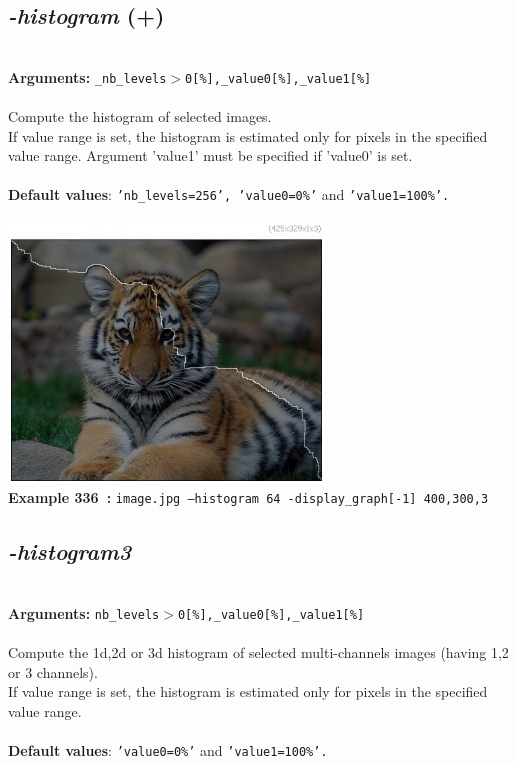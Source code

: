 \documentclass[a4paper,11pt,twoside]{book}
\begin{document}
\subsection{\emph{-histogram} (+)}\vspace*{-0.5em}
~\\\textbf{Arguments: } 
{\small \texttt{\_nb\_levels$>$0[\%],\_value0[\%],\_value1[\%]}}\\~\\
Compute the histogram of selected images.
~\\If value range is set, the histogram is estimated only for pixels in the specified
value range. Argument 'value1' must be specified if 'value0' is set.
~\\~\\\textbf{Default values}: {\small \texttt{'nb\_levels=256', 'value0=0\%'} and \texttt{'value1=100\%'.}}
\begin{center}\includegraphics[keepaspectratio=true,height=7cm,width=\textwidth]{img/gmic_def336.jpg}\\
{\footnotesize \textbf{Example 336~:} \texttt{image.jpg --histogram 64 -display\_graph[-1] 400,300,3}}
\end{center}

\subsection{\emph{-histogram3} }\vspace*{-0.5em}
~\\\textbf{Arguments: } 
{\small \texttt{nb\_levels$>$0[\%],\_value0[\%],\_value1[\%]}}\\~\\
Compute the 1d,2d or 3d histogram of selected multi-channels images (having 1,2 or 3 channels).
~\\If value range is set, the histogram is estimated only for pixels in the specified
value range.
~\\~\\\textbf{Default values}: {\small \texttt{'value0=0\%'} and \texttt{'value1=100\%'.}}
\end{document}
